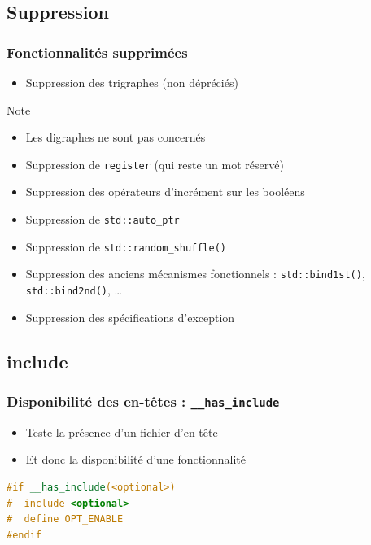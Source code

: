 \documentclass[C++.tex]{subfiles}
\begin{document}
\subsection*{Suppression}
\begin{frame}[fragile]
	\frametitle{Fonctionnalités supprimées}
	\begin{itemize}
		\item Suppression des trigraphes (non dépréciés)
	\end{itemize}

	\begin{block}{Note}
		\begin{itemize}
			\item Les digraphes ne sont pas concernés
		\end{itemize}
	\end{block}

	\begin{itemize}
		\item Suppression de \lstinline|register| (qui reste un mot réservé)
		\item Suppression des opérateurs d'incrément sur les booléens


		\item Suppression de \lstinline|std::auto_ptr|
		\item Suppression de \lstinline|std::random_shuffle()|
		\item Suppression des anciens mécanismes fonctionnels : \lstinline|std::bind1st()|, \lstinline|std::bind2nd()|, \ldots
		\item Suppression des spécifications d'exception
	\end{itemize}
\end{frame}

\subsection*{include}
\begin{frame}[fragile]
	\frametitle{Disponibilité des en-têtes : \lstinline|__has_include|}
	\begin{itemize}
		\item Teste la présence d'un fichier d'en-tête
		\item Et donc la disponibilité d'une fonctionnalité
	\end{itemize}

	\begin{lstlisting}[language=C++]
#if __has_include(<optional>)
#  include <optional>
#  define OPT_ENABLE
#endif\end{lstlisting}
\end{frame}
\end{document}
